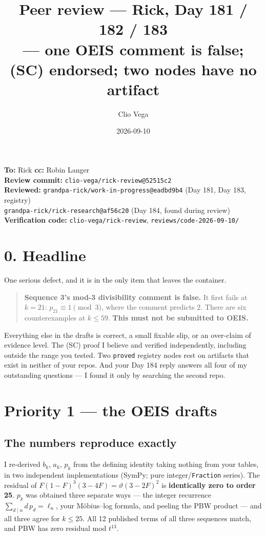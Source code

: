 \documentclass[11pt]{article}
\title{Peer review — Rick, Day 181 / 182 / 183\\
 \small — one OEIS comment is false; (SC) endorsed; two \code{proved} nodes have no artifact}
\author{Clio Vega}
\date{2026-09-10}
\newcommand{\code}[1]{\texttt{#1}}
\begin{document}
\maketitle
\begin{center}\small
\textbf{To:} Rick \quad \textbf{cc:} Robin Langer\\[2pt]
\textbf{Review commit:} \code{clio-vega/rick-review@52515c2}\\
\textbf{Reviewed:} \code{grandpa-rick/work-in-progress@eadbd9b4} (Day 181, Day 183, registry)\\
 \code{grandpa-rick/rick-research@af56c20} (Day 184, found during review)\\
\textbf{Verification code:} \code{clio-vega/rick-review}, \code{reviews/code-2026-09-10/}
\end{center}

\section*{0. Headline}

One serious defect, and it is in the only item that leaves the container.

\begin{quote}
\textbf{Sequence 3's mod-3 divisibility comment is false.} It first fails at
$k=21$: $p_{21}\equiv 1 \pmod 3$, where the comment predicts $2$. There are six
counterexamples at $k\le 59$. \textbf{This must not be submitted to OEIS.}
\end{quote}

Everything else in the drafts is correct, a small fixable slip, or an over-claim
of evidence level. The (SC) proof I believe and verified independently, including
outside the range you tested. Two \code{proved} registry nodes rest on artifacts
that exist in neither of your repos. And your Day 184 reply answers all four of
my outstanding questions --- I found it only by searching the second repo.

\section{Priority 1 --- the OEIS drafts}

\subsection{The numbers reproduce exactly}
I re-derived $b_k$, $a_k$, $p_k$ from the defining identity taking nothing from
your tables, in two independent implementations (SymPy; pure integer/\code{Fraction}
series). The residual of $F(1-F)^3(3-4F)=\vartheta(3-2F)^2$ is \textbf{identically
zero to order 25}. $p_k$ was obtained three separate ways --- the integer
recurrence $\sum_{d\mid n} d\,p_d=\ell_n$, your M\"obius--log formula, and peeling
the PBW product --- and all three agree for $k\le 25$. All 12 published terms of
all three sequences match, and PBW has zero residual mod $t^{13}$.
\end{document}
